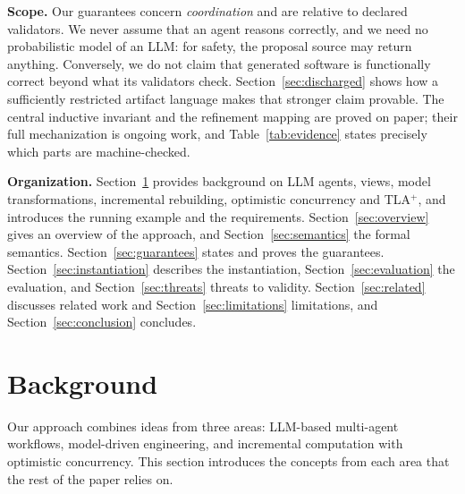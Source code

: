 \documentclass[10pt,journal,compsoc]{IEEEtran}
\theoremstyle{plain}
\theoremstyle{definition}
\begin{document}
\textbf{Scope.} Our guarantees concern \emph{coordination} and are relative to declared validators. We never assume that an agent reasons correctly, and we need no probabilistic model of an LLM: for safety, the proposal source may return anything. Conversely, we do not claim that generated software is functionally correct beyond what its validators check. Section~\ref{sec:discharged} shows how a sufficiently restricted artifact language makes that stronger claim provable. The central inductive invariant and the refinement mapping are proved on paper; their full mechanization is ongoing work, and Table~\ref{tab:evidence} states precisely which parts are machine-checked.

\textbf{Organization.} Section~\ref{sec:background} provides background on LLM agents, views, model transformations, incremental rebuilding, optimistic concurrency and TLA$^+$, and introduces the running example and the requirements. Section~\ref{sec:overview} gives an overview of the approach, and Section~\ref{sec:semantics} the formal semantics. Section~\ref{sec:guarantees} states and proves the guarantees. Section~\ref{sec:instantiation} describes the instantiation, Section~\ref{sec:evaluation} the evaluation, and Section~\ref{sec:threats} threats to validity. Section~\ref{sec:related} discusses related work and Section~\ref{sec:limitations} limitations, and Section~\ref{sec:conclusion} concludes.

\section{Background}\label{sec:background}
Our approach combines ideas from three areas: LLM-based multi-agent workflows, model-driven engineering, and incremental computation with optimistic concurrency. This section introduces the concepts from each area that the rest of the paper relies on.

\end{document}
